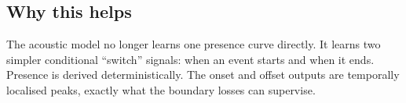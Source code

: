 \subsection{Why this helps}
The acoustic model no longer learns one presence curve directly. It learns two
simpler conditional ``switch'' signals: when an event starts and when it ends.
Presence is derived deterministically. The onset and offset outputs are
temporally localised peaks, exactly what the boundary losses can supervise.
